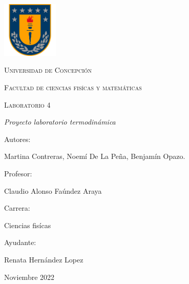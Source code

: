 \documentclass[a4paper, 12p]{article}
\begin{document}
\begin{titlepage}
      \begin{center}     
            
            \includegraphics[width=0.2\textwidth]{img/escudo_udec.png}                       %
            
            
            
            \vspace{1cm}
            \textsc{{\LARGE Universidad de Concepción}}
            
            \vspace{1cm}
            {\scshape\Large Facultad de ciencias fisícas y matemáticas \par}
            \vspace{2cm}
            {\scshape\Huge Laboratorio 4 \par}
            \vspace{2cm}
            {\itshape\Large Proyecto laboratorio termodinámica \par}
            \vfill
            {\Large Autores: \par}
            {\Large Martina Contreras, Noemí De La Peña, Benjamín Opazo. \par}
            \vfill
            \vfill
            {\Large Profesor: \par}
            {\Large Claudio Alonso Faúndez Araya \par}
            \vfill
            \vfill
            {\Large Carrera: \par}
            {\Large Ciencias fisícas \par}
            \vfill
            \vfill
            {\Large Ayudante: \par}
            {\Large Renata Hernández Lopez \par}
            \vfill
            {\Large Noviembre 2022 \par}
      \end{center}
\end{titlepage}            


\tableofcontents
\newpage

\end{document}
